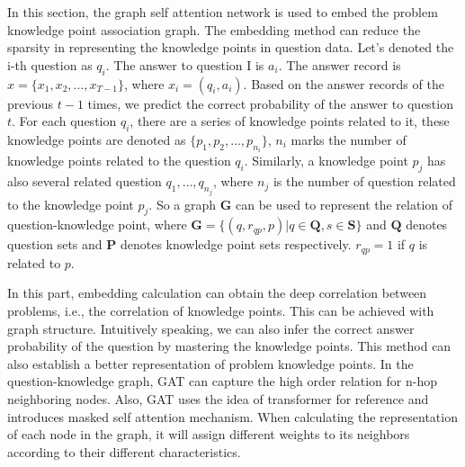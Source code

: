 In this section, the graph self attention network is used to embed the problem knowledge point association graph. The embedding method can reduce the sparsity in representing the knowledge points in question data. Let's denoted the i-th question as \(q_i\). The answer to question I is \(a_i\). The answer record is \(x = \{x_1,x_2,\ldots,x_{T-1}\} \), where \(x_i=(q_i,a_i)\). Based on the answer records of the previous \(t-1\) times, we predict the correct probability of the answer to question \(t\). For each question \(q_i\), there are a series of knowledge points related to it, these knowledge points are denoted as \( \{p_1,p_2,\ldots,p_{n_i}\} \), \(n_i\) marks the number of knowledge points related to the question \(q_i\). Similarly, a knowledge point \(p_j\) has also several related question \(q_1,\ldots,q_{n_j}\), where \(n_j\) is the number of question related to the knowledge point \(p_j\). So a graph \(\mathbf{G}\) can be used to represent the relation of question-knowledge point, where \(\mathbf{G}=\{(q, r_{qp}, p) | q \in \mathbf{Q}, s \in \mathbf{S}\}\) and \(\mathbf{Q}\) denotes question sets and \(\mathbf{P}\) denotes knowledge point sets respectively. \(r_{qp}=1\) if \(q\) is related to \(p\).

In this part, embedding calculation can obtain the deep correlation between problems, i.e., the correlation of knowledge points. This can be achieved with graph structure. Intuitively speaking, we can also infer the correct answer probability of the question by mastering the knowledge points. This method can also establish a better representation of problem knowledge points. In the question-knowledge graph, GAT can capture the high order relation for n-hop neighboring nodes. Also, GAT uses the idea of transformer for reference and introduces masked self attention mechanism. When calculating the representation of each node in the graph, it will assign different weights to its neighbors according to their different characteristics.

